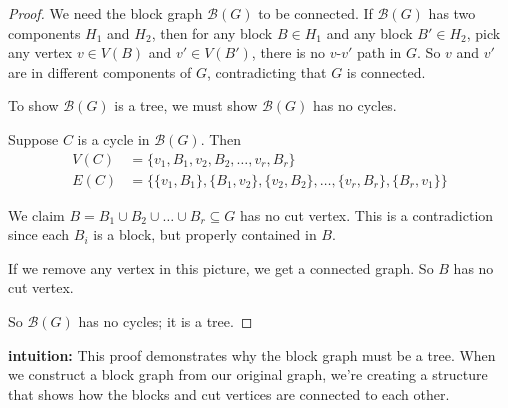 \documentclass{article}
\theoremstyle{definition}
\begin{document}
\begin{proof}
We need the block graph $\mathcal{B}(G)$ to be connected. If $\mathcal{B}(G)$ has two components $H_1$ and $H_2$, then for any block $B \in H_1$ and any block $B' \in H_2$, pick any vertex $v \in V(B)$ and $v' \in V(B')$, there is no $v$-$v'$ path in $G$. So $v$ and $v'$ are in different components of $G$, contradicting that $G$ is connected.

To show $\mathcal{B}(G)$ is a tree, we must show $\mathcal{B}(G)$ has no cycles.

Suppose $C$ is a cycle in $\mathcal{B}(G)$. Then
\begin{align*}
V(C) &= \{v_1, B_1, v_2, B_2, \ldots, v_r, B_r\} \\
E(C) &= \{\{v_1, B_1\}, \{B_1, v_2\}, \{v_2, B_2\}, \ldots, \{v_r, B_r\}, \{B_r, v_1\}\}
\end{align*}

We claim $B = B_1 \cup B_2 \cup \ldots \cup B_r \subseteq G$ has no cut vertex. This is a contradiction since each $B_i$ is a block, but properly contained in $B$.

If we remove any vertex in this picture, we get a connected graph. So $B$ has no cut vertex.

So $\mathcal{B}(G)$ has no cycles; it is a tree.
\end{proof}

\medskip
\noindent\textbf{intuition:} This proof demonstrates why the block graph must be a tree. When we construct a block graph from our original graph, we're creating a structure that shows how the blocks and cut vertices are connected to each other.
\end{document}
